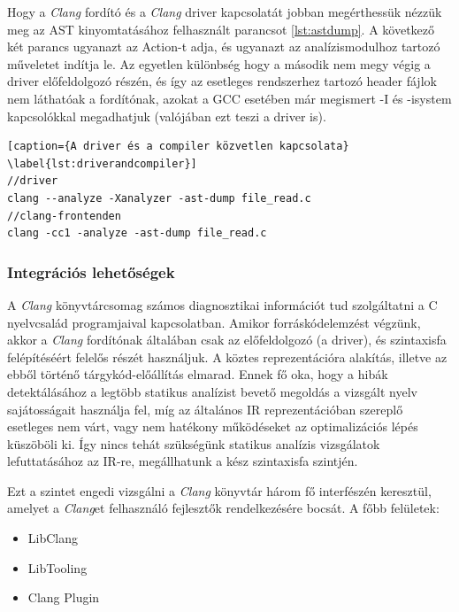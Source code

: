 \documentclass[a4paper,12pt]{report}
\begin{document}
Hogy a \emph{Clang} fordító és a \emph{Clang} driver kapcsolatát jobban megérthessük nézzük meg az AST kinyomtatásához felhasznált parancsot \ref{lst:astdump}. A következő két parancs ugyanazt az Action-t adja, és ugyanazt az analízismodulhoz tartozó műveletet indítja le. Az egyetlen különbség hogy a második nem megy végig a driver előfeldolgozó részén, és így az esetleges rendszerhez tartozó header fájlok nem láthatóak a fordítónak, azokat a GCC esetében már megismert -I és -isystem kapcsolókkal megadhatjuk (valójában ezt teszi a driver is).

\begin{lstlisting}[caption={A driver és a compiler közvetlen kapcsolata}
\label{lst:driverandcompiler}]
//driver
clang --analyze -Xanalyzer -ast-dump file_read.c
//clang-frontenden
clang -cc1 -analyze -ast-dump file_read.c
\end{lstlisting}

\subsubsection{Integrációs lehetőségek}
A \emph{Clang} könyvtárcsomag számos diagnosztikai információt tud szolgáltatni a C nyelvcsalád programjaival kapcsolatban. Amikor forráskódelemzést végzünk, akkor a \emph{Clang} fordítónak általában csak az előfeldolgozó (a driver), és szintaxisfa felépítéséért felelős részét használjuk. A köztes reprezentációra alakítás, illetve az ebből történő tárgykód-előállítás elmarad. Ennek fő oka, hogy a hibák detektálásához a legtöbb statikus analízist bevető megoldás a vizsgált nyelv sajátosságait használja fel, míg az általános IR reprezentációban szereplő esetleges nem várt, vagy nem hatékony működéseket az optimalizációs lépés küszöböli ki. Így nincs tehát szükségünk statikus analízis vizsgálatok lefuttatásához az IR-re, megállhatunk a kész szintaxisfa szintjén.

Ezt a szintet engedi vizsgálni a \emph{Clang} könyvtár három fő interfészén keresztül, amelyet a \emph{Clang}et felhasználó fejlesztők rendelkezésére bocsát. A főbb felületek:
\begin{itemize}
\item LibClang
\item LibTooling
\item Clang Plugin
\end{itemize}
\end{document}
